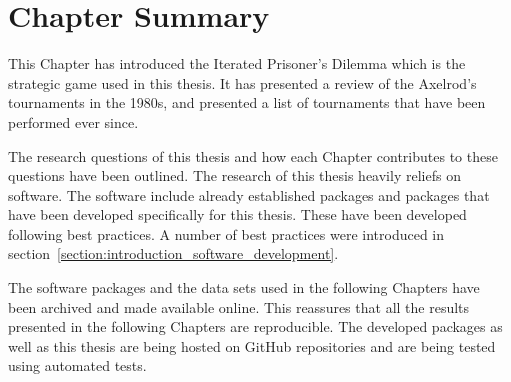\section{Chapter Summary}

This Chapter has introduced the Iterated Prisoner's Dilemma which is the
strategic game used in this thesis. It has presented a review of the Axelrod's
tournaments in the 1980s, and presented a list of tournaments that have been
performed ever since.

The research questions of this thesis and how each Chapter contributes to these
questions have been outlined. The research of this thesis heavily reliefs on
software. The software include already established packages and packages that
have been developed specifically for this thesis. These have been developed
following best practices. A number of best practices were introduced in
section~\ref{section:introduction_software_development}.

The software packages and the data sets used in the following Chapters have been
archived and made available online. This reassures that all the results
presented in the following Chapters are reproducible. The developed packages as
well as this thesis are being hosted on GitHub repositories and are being tested
using automated tests.
